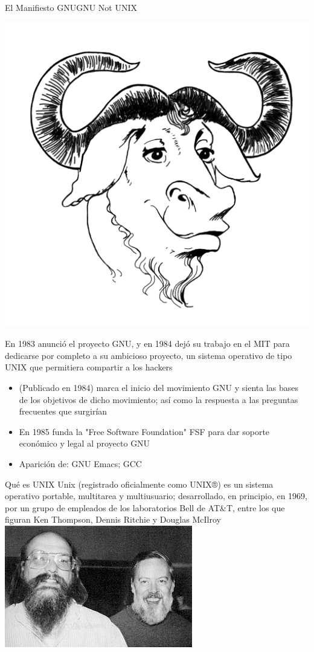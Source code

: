 \documentclass{beamer}
\begin{document}
\begin{frame}{El Manifiesto GNU}{GNU Not UNIX}
\begin{center}
\includegraphics[scale=0.055]{gnu.png}
\end{center}
En 1983 anunció el proyecto GNU, y en 1984 dejó su trabajo en el MIT para dedicarse por completo a su ambicioso proyecto, un sistema operativo de
tipo UNIX que permitiera compartir a los hackers
\begin{itemize}
\item (Publicado en 1984) marca el inicio del movimiento GNU y sienta las bases de los objetivos de dicho movimiento; así como la respuesta a las preguntas frecuentes que surgirían
\item En 1985 funda la "Free Software Foundation" FSF
para dar soporte económico y legal  al proyecto GNU
\item Aparición de: GNU Emacs; GCC
\end{itemize}
\end{frame}

\begin {frame}{Qué es UNIX}
Unix (registrado oficialmente como UNIX®) es un sistema operativo portable, multitarea y multiusuario; desarrollado, en principio, en 1969, por un grupo de empleados de los laboratorios Bell de AT\&T, entre los que figuran Ken Thompson, Dennis Ritchie y Douglas McIlroy
\includegraphics[scale=0.7]{ritchie.jpg}
\end{frame}
\end{document}
